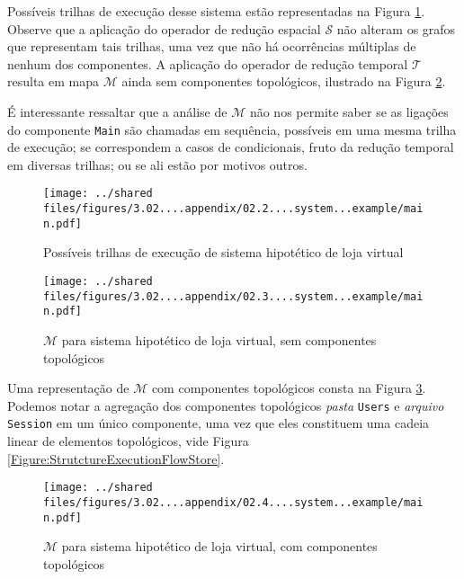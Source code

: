 \begin{apendicesenv}
Possíveis trilhas de execução desse sistema estão representadas na Figura
\ref{Figure:ExecutionTracesStore}. Observe que a aplicação do operador de
redução espacial $\mathcal{S}$ não alteram os grafos que representam tais
trilhas, uma vez que não há ocorrências múltiplas de nenhum dos componentes.
A aplicação do operador de redução temporal $\mathcal{T}$ resulta em mapa
$\mathcal{M}$ ainda sem componentes topológicos, ilustrado na Figura
\ref{Figure:StoreMap}.

É interessante ressaltar que a análise de $\mathcal{M}$ não nos permite saber
se as ligações do componente \texttt{Main} são chamadas em sequência, possíveis
em uma mesma trilha de execução; se correspondem a casos de condicionais,
fruto da redução temporal em diversas trilhas; ou se ali estão por motivos
outros.

\pagebreak

\begin{figure}[!htb]
    \centering
    \caption{Possíveis trilhas de execução de sistema hipotético de loja virtual}
    \texttt{[image: ../shared files/figures/3.02....appendix/02.2....system...example/main.pdf]}
    \label{Figure:ExecutionTracesStore}
\end{figure}

\begin{figure}[!htb]
    \centering
    \caption{$\mathcal{M}$ para sistema hipotético de loja virtual, sem componentes topológicos}
    \texttt{[image: ../shared files/figures/3.02....appendix/02.3....system...example/main.pdf]}
    \label{Figure:StoreMap}
\end{figure}


Uma representação de $\mathcal{M}$ com componentes topológicos consta na
Figura \ref{Figure:StoreTopologicalMap}. Podemos notar a agregação dos
componentes topológicos \textit{pasta} \texttt{Users} e \textit{arquivo}
\texttt{Session} em um único componente, uma vez que eles constituem uma cadeia
linear de elementos topológicos, vide Figura \ref{Figure:StrutctureExecutionFlowStore}.


\begin{figure}[!htb]
    \centering
    \caption{$\mathcal{M}$ para sistema hipotético de loja virtual, com componentes topológicos}
    \texttt{[image: ../shared files/figures/3.02....appendix/02.4....system...example/main.pdf]}
    \label{Figure:StoreTopologicalMap}
\end{figure}


\end{apendicesenv}
